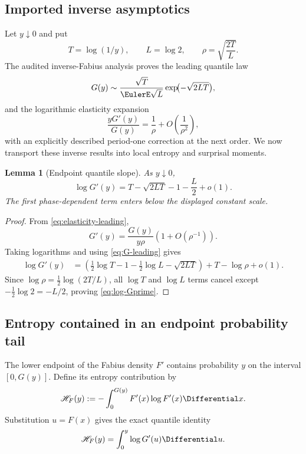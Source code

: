 \documentclass[11pt,oneside]{article}
\newtheorem{lemma}[theorem]{Lemma}
\theoremstyle{definition}
\theoremstyle{remark}
\begin{document}
\subsection{Imported inverse asymptotics}

Let $y\downarrow0$ and put
\begin{equation}
 T=\log(1/y),
 \qquad L=\log2,
 \qquad \rho=\sqrt{\frac{2T}{L}}.
 \label{eq:T-rho}
\end{equation}
The audited inverse-Fabius analysis proves the leading quantile law
\begin{equation}
 G(y)
 \sim\frac{\sqrt T}{\EulerE\sqrt L}
       \exp\!\bigl(-\sqrt{2LT}\bigr),
 \label{eq:G-leading}
\end{equation}
and the logarithmic elasticity expansion
\begin{equation}
 \frac{yG'(y)}{G(y)}
 =\frac1\rho+O\!\left(\frac1{\rho^2}\right),
 \label{eq:elasticity-leading}
\end{equation}
with an explicitly described period-one correction at the next order.  We now
transport these inverse results into local entropy and surprisal moments.

\begin{lemma}[Endpoint quantile slope]
\label{lem:log-Gprime}
As $y\downarrow0$,
\begin{equation}
 \boxed{
 \log G'(y)
 =T-\sqrt{2LT}-1-\frac L2+o(1).}
 \label{eq:log-Gprime}
\end{equation}
The first phase-dependent term enters below the displayed constant scale.
\end{lemma}

\begin{proof}
From \eqref{eq:elasticity-leading},
\[
 G'(y)=\frac{G(y)}{y\rho}\left(1+O(\rho^{-1})\right).
\]
Taking logarithms and using \eqref{eq:G-leading} gives
\begin{align*}
 \log G'(y)
 &=\left(\frac12\log T-1-\frac12\log L-\sqrt{2LT}\right)
   +T-\log\rho+o(1).
\end{align*}
Since
$\log\rho=\tfrac12\log(2T/L)$, all $\log T$ and $\log L$ terms cancel except
$-\tfrac12\log2=-L/2$, proving \eqref{eq:log-Gprime}.
\end{proof}

\subsection{Entropy contained in an endpoint probability tail}

The lower endpoint of the Fabius density $F'$ contains probability $y$ on the
interval $[0,G(y)]$.  Define its entropy contribution by
\begin{equation}
 \mathscr H_F(y)
 :=-\int_0^{G(y)}F'(x)\log F'(x)\Differential x.
 \label{eq:tail-entropy-F-def}
\end{equation}
Substitution $u=F(x)$ gives the exact quantile identity
\begin{equation}
 \mathscr H_F(y)=\int_0^y\log G'(u)\Differential u.
 \label{eq:tail-entropy-quantile}
\end{equation}
\end{document}
